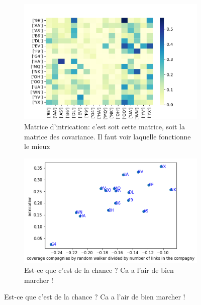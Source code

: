 \documentclass{svproc}
\begin{document}
\begin{figure}
\begin{subfigure}{0.45\textwidth}
	\includegraphics[width=\textwidth]{img/planes/intricplanes.pdf}
	\caption{Matrice d'intrication: c'est soit cette matrice, soit la matrice des covariance. Il faut voir laquelle fonctionne le mieux }
\end{subfigure}
\begin{subfigure}{0.45\textwidth}
	\includegraphics[width=\textwidth]{img/planes/intricetcovtraffique.png}
	\caption{Est-ce que c'est de la chance ? Ca a l'air de bien marcher ! }
\end{subfigure}
\end{figure}
\end{document}
